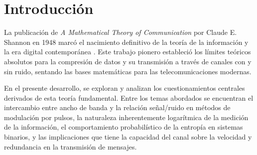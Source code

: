 \chapter{Introducción}

La publicación de \textit{A Mathematical Theory of Communication} por Claude E. Shannon en 1948 marcó el nacimiento definitivo de la teoría de la información y la era digital contemporánea \parencite{shannon1948mathematical}. Este trabajo pionero estableció los límites teóricos absolutos para la compresión de datos y su transmisión a través de canales con y sin ruido, sentando las bases matemáticas para las telecomunicaciones modernas.

En el presente desarrollo, se exploran y analizan los cuestionamientos centrales derivados de esta teoría fundamental. Entre los temas abordados se encuentran el intercambio entre ancho de banda y la relación señal/ruido en métodos de modulación por pulsos, la naturaleza inherentemente logarítmica de la medición de la información, el comportamiento probabilístico de la entropía en sistemas binarios, y las implicaciones que tiene la capacidad del canal sobre la velocidad y redundancia en la transmisión de mensajes.
